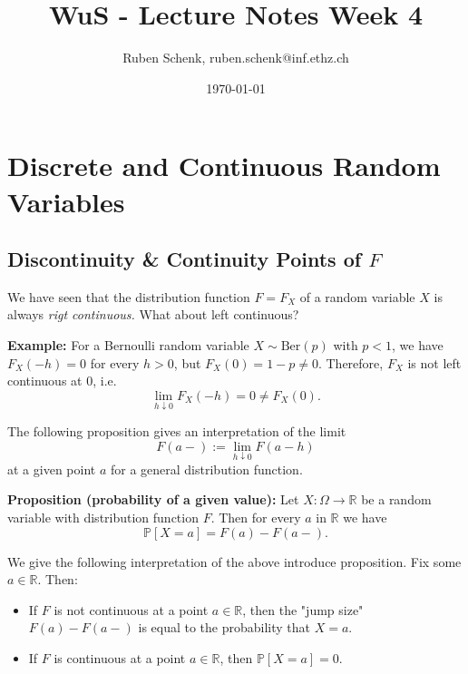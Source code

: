 \documentclass[a4paper]{extarticle}
\title{WuS - Lecture Notes Week 4}
\author{Ruben Schenk, ruben.schenk@inf.ethz.ch}
\date{\today}
\begin{document}
\maketitle
\newpage

\section{Discrete and Continuous Random Variables}

\subsection{Discontinuity \& Continuity Points of \(F\)}

We have seen that the distribution function \(F = F_X\) of a random variable \(X\) is always \textit{rigt continuous.} What about left continuous?

\begin{ebox}
    \textbf{Example:} For a Bernoulli random variable \(X \sim \text{Ber}(p)\) with \(p < 1\), we have \(F_X(-h) = 0\) for every \(h > 0\), but \(F_X(0) = 1 - p \neq 0\). Therefore, \(F_X\) is not left continuous at \(0\), i.e.
    \[
        \lim_{h \downarrow 0} F_X(-h) = 0 \neq F_X(0).
    \]
\end{ebox}

The following proposition gives an interpretation of the limit
\[
    F(a-) := \lim_{h \downarrow 0} F(a - h)
\]
at a given point \(a\) for a general distribution function.

\begin{cbox}
    \textbf{Proposition (probability of a given value):} Let \(X : \Omega \to \mathbb{R}\) be a random variable with distribution function \(F\). Then for every \(a\) in \(\mathbb{R}\) we have
    \[
        \mathbb{P}[X = a] = F(a) - F(a -).
    \]
\end{cbox}

We give the following interpretation of the above introduce proposition. Fix some \(a \in \mathbb{R}\). Then:

\begin{itemize}
    \item If \(F\) is not continuous at a point \(a \in \mathbb{R}\), then the "jump size" \(F(a) - F(a -)\) is equal to the probability that \(X = a\).
    \item If \(F\) is continuous at a point \(a \in \mathbb{R}\), then \(\mathbb{P}[X = a] = 0\).
\end{itemize}
\end{document}
